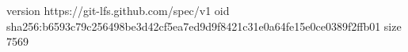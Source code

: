 version https://git-lfs.github.com/spec/v1
oid sha256:b6593c79c256498be3d42cf5ea7ed9d9f8421c31e0a64fe15e0ce0389f2ffb01
size 7569
